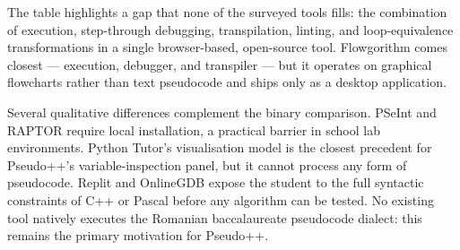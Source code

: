 The table highlights a gap that none of the surveyed tools fills: the
combination of execution, step-through debugging, transpilation, linting,
and loop-equivalence transformations in a single browser-based,
open-source tool.  Flowgorithm comes closest --- execution, debugger, and
transpiler --- but it operates on graphical flowcharts rather than text
pseudocode and ships only as a desktop application.

Several qualitative differences complement the binary comparison.
PSeInt and RAPTOR require local installation, a practical barrier in
school lab environments.  Python Tutor's visualisation model is the
closest precedent for Pseudo++'s variable-inspection panel, but it
cannot process any form of pseudocode.  Replit and OnlineGDB expose
the student to the full syntactic constraints of C++ or Pascal before
any algorithm can be tested.
No existing tool natively executes the Romanian baccalaureate
pseudocode dialect: this remains the primary motivation for Pseudo++.

